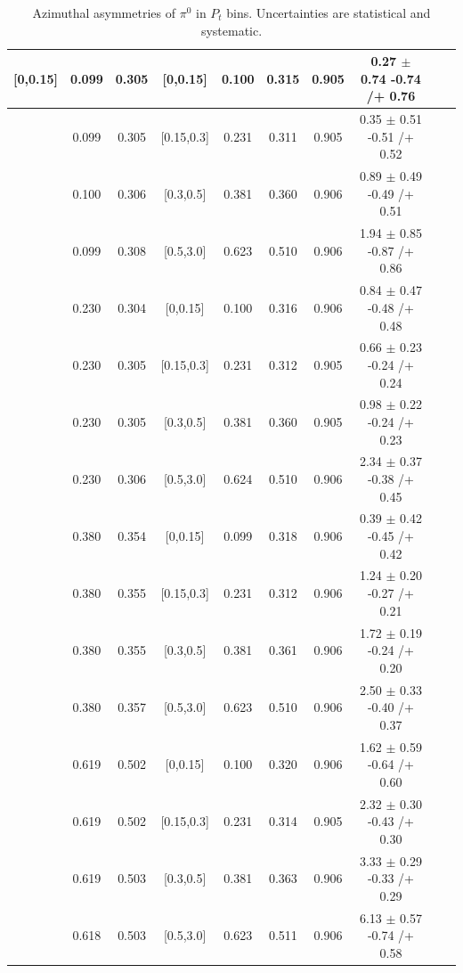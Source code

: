\begin{table}[H]
\begin{tabular}{|c| c| c| c| c| c| c| c| c| c|}
[0,0.15]	&	0.099	&	0.305	&	[0,0.15]	&	0.100	&	0.315	&	0.905	&	0.27	$\pm$	0.74	-0.74	/+	0.76	\\ \hline
[0,0.15]	&	0.099	&	0.305	&	[0.15,0.3]	&	0.231	&	0.311	&	0.905	&	0.35	$\pm$	0.51	-0.51	/+	0.52	\\ \hline
[0,0.15]	&	0.100	&	0.306	&	[0.3,0.5]	&	0.381	&	0.360	&	0.906	&	0.89	$\pm$	0.49	-0.49	/+	0.51	\\ \hline
[0,0.15]	&	0.099	&	0.308	&	[0.5,3.0]	&	0.623	&	0.510	&	0.906	&	1.94	$\pm$	0.85	-0.87	/+	0.86	\\ \hline
[0.15,0.3]	&	0.230	&	0.304	&	[0,0.15]	&	0.100	&	0.316	&	0.906	&	0.84	$\pm$	0.47	-0.48	/+	0.48	\\ \hline
[0.15,0.3]	&	0.230	&	0.305	&	[0.15,0.3]	&	0.231	&	0.312	&	0.905	&	0.66	$\pm$	0.23	-0.24	/+	0.24	\\ \hline
[0.15,0.3]	&	0.230	&	0.305	&	[0.3,0.5]	&	0.381	&	0.360	&	0.905	&	0.98	$\pm$	0.22	-0.24	/+	0.23	\\ \hline
[0.15,0.3]	&	0.230	&	0.306	&	[0.5,3.0]	&	0.624	&	0.510	&	0.906	&	2.34	$\pm$	0.37	-0.38	/+	0.45	\\ \hline
[0.3,0.5]	&	0.380	&	0.354	&	[0,0.15]	&	0.099	&	0.318	&	0.906	&	0.39	$\pm$	0.42	-0.45	/+	0.42	\\ \hline
[0.3,0.5]	&	0.380	&	0.355	&	[0.15,0.3]	&	0.231	&	0.312	&	0.906	&	1.24	$\pm$	0.20	-0.27	/+	0.21	\\ \hline
[0.3,0.5]	&	0.380	&	0.355	&	[0.3,0.5]	&	0.381	&	0.361	&	0.906	&	1.72	$\pm$	0.19	-0.24	/+	0.20	\\ \hline
[0.3,0.5]	&	0.380	&	0.357	&	[0.5,3.0]	&	0.623	&	0.510	&	0.906	&	2.50	$\pm$	0.33	-0.40	/+	0.37	\\ \hline
[0.5,3.0]	&	0.619	&	0.502	&	[0,0.15]	&	0.100	&	0.320	&	0.906	&	1.62	$\pm$	0.59	-0.64	/+	0.60	\\ \hline
[0.5,3.0]	&	0.619	&	0.502	&	[0.15,0.3]	&	0.231	&	0.314	&	0.905	&	2.32	$\pm$	0.30	-0.43	/+	0.30	\\ \hline
[0.5,3.0]	&	0.619	&	0.503	&	[0.3,0.5]	&	0.381	&	0.363	&	0.906	&	3.33	$\pm$	0.29	-0.33	/+	0.29	\\ \hline
[0.5,3.0]	&	0.618	&	0.503	&	[0.5,3.0]	&	0.623	&	0.511	&	0.906	&	6.13	$\pm$	0.57	-0.74	/+	0.58	\\ \hline
\end{tabular}
\caption{Azimuthal asymmetries of $\pi^0$ in $P_t$ bins. Uncertainties are statistical and systematic.}
\label{tab:finalpi0ptbin}
\end{table}

